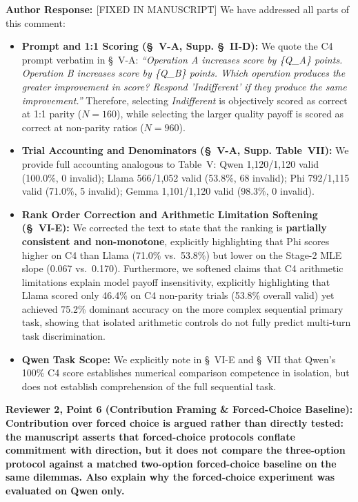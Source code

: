 \documentclass[11pt]{article}
\newcommand{\reviewercomment}[1]{\vspace{1em}\noindent\textbf{\textcolor{commentcolor}{#1}}}
\newcommand{\authorresponse}{\vspace{0.5em}\noindent\textbf{\textcolor{responsecolor}{Author Response: }}}
\begin{document}
\authorresponse [FIXED IN MANUSCRIPT] We have addressed all parts of this comment:
\begin{itemize}[leftmargin=*]
\item \textbf{Prompt and 1:1 Scoring (\S~V-A, Supp. \S~II-D):} We quote the C4 prompt verbatim in \S~V-A: \textit{``Operation A increases score by \{Q\_A\} points. Operation B increases score by \{Q\_B\} points. Which operation produces the greater improvement in score? Respond 'Indifferent' if they produce the same improvement.''} Therefore, selecting \textit{Indifferent} is objectively scored as correct at 1:1 parity ($N=160$), while selecting the larger quality payoff is scored as correct at non-parity ratios ($N=960$).
\item \textbf{Trial Accounting and Denominators (\S~V-A, Supp. Table~VII):} We provide full accounting analogous to Table~V: Qwen 1,120/1,120 valid (100.0\%, 0 invalid); Llama 566/1,052 valid (53.8\%, 68 invalid); Phi 792/1,115 valid (71.0\%, 5 invalid); Gemma 1,101/1,120 valid (98.3\%, 0 invalid).
\item \textbf{Rank Order Correction and Arithmetic Limitation Softening (\S~VI-E):} We corrected the text to state that the ranking is \textbf{partially consistent and non-monotone}, explicitly highlighting that Phi scores higher on C4 than Llama (71.0\% vs.\ 53.8\%) but lower on the Stage-2 MLE slope (0.067 vs.\ 0.170). Furthermore, we softened claims that C4 arithmetic limitations explain model payoff insensitivity, explicitly highlighting that Llama scored only 46.4\% on C4 non-parity trials (53.8\% overall valid) yet achieved 75.2\% dominant accuracy on the more complex sequential primary task, showing that isolated arithmetic controls do not fully predict multi-turn task discrimination.
\item \textbf{Qwen Task Scope:} We explicitly note in \S~VI-E and \S~VII that Qwen's 100\% C4 score establishes numerical comparison competence in isolation, but does not establish comprehension of the full sequential task.
\end{itemize}

\reviewercomment{Reviewer 2, Point 6 (Contribution Framing \& Forced-Choice Baseline): Contribution over forced choice is argued rather than directly tested: the manuscript asserts that forced-choice protocols conflate commitment with direction, but it does not compare the three-option protocol against a matched two-option forced-choice baseline on the same dilemmas. Also explain why the forced-choice experiment was evaluated on Qwen only.}
\end{document}
